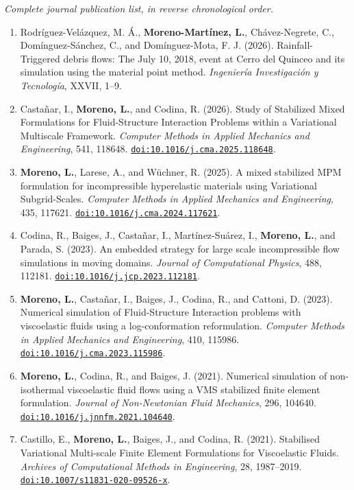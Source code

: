 \documentclass[a4paper,11pt]{article}
\newcommand{\cvsection}[1]{\par\vspace{8pt}{\large\bfseries\color{heading}#1}\par\vspace{3pt}}
\newcommand{\me}{\textbf{Moreno, L.}}
\begin{document}
\endgroup
\newpage
\cvsection{Publications}
\textit{Complete journal publication list, in reverse chronological order.}
\begin{enumerate}
\item Rodríguez-Velázquez, M. Á., \textbf{Moreno-Martínez, L.}, Chávez-Negrete, C., Domínguez-Sánchez, C., and Domínguez-Mota, F. J. (2026). Rainfall-Triggered debris flows: The July 10, 2018, event at Cerro del Quinceo and its simulation using the material point method. \textit{Ingeniería Investigación y Tecnología}, XXVII, 1--9.
\item Castañar, I., \me, and Codina, R. (2026). Study of Stabilized Mixed Formulations for Fluid-Structure Interaction Problems within a Variational Multiscale Framework. \textit{Computer Methods in Applied Mechanics and Engineering}, 541, 118648. \href{https://doi.org/10.1016/j.cma.2025.118648}{\nolinkurl{doi:10.1016/j.cma.2025.118648}}.
\item \me, Larese, A., and Wüchner, R. (2025). A mixed stabilized MPM formulation for incompressible hyperelastic materials using Variational Subgrid-Scales. \textit{Computer Methods in Applied Mechanics and Engineering}, 435, 117621. \href{https://doi.org/10.1016/j.cma.2024.117621}{\nolinkurl{doi:10.1016/j.cma.2024.117621}}.
\item Codina, R., Baiges, J., Castañar, I., Martínez-Suárez, I., \me, and Parada, S. (2023). An embedded strategy for large scale incompressible flow simulations in moving domains. \textit{Journal of Computational Physics}, 488, 112181. \href{https://doi.org/10.1016/j.jcp.2023.112181}{\nolinkurl{doi:10.1016/j.jcp.2023.112181}}.
\item \me, Castañar, I., Baiges, J., Codina, R., and Cattoni, D. (2023). Numerical simulation of Fluid-Structure Interaction problems with viscoelastic fluids using a log-conformation reformulation. \textit{Computer Methods in Applied Mechanics and Engineering}, 410, 115986. \href{https://doi.org/10.1016/j.cma.2023.115986}{\nolinkurl{doi:10.1016/j.cma.2023.115986}}.
\item \me, Codina, R., and Baiges, J. (2021). Numerical simulation of non-isothermal viscoelastic fluid flows using a VMS stabilized finite element formulation. \textit{Journal of Non-Newtonian Fluid Mechanics}, 296, 104640. \href{https://doi.org/10.1016/j.jnnfm.2021.104640}{\nolinkurl{doi:10.1016/j.jnnfm.2021.104640}}.
\item Castillo, E., \me, Baiges, J., and Codina, R. (2021). Stabilised Variational Multi-scale Finite Element Formulations for Viscoelastic Fluids. \textit{Archives of Computational Methods in Engineering}, 28, 1987--2019. \href{https://doi.org/10.1007/s11831-020-09526-x}{\nolinkurl{doi:10.1007/s11831-020-09526-x}}.

\end{enumerate}
\end{document}
